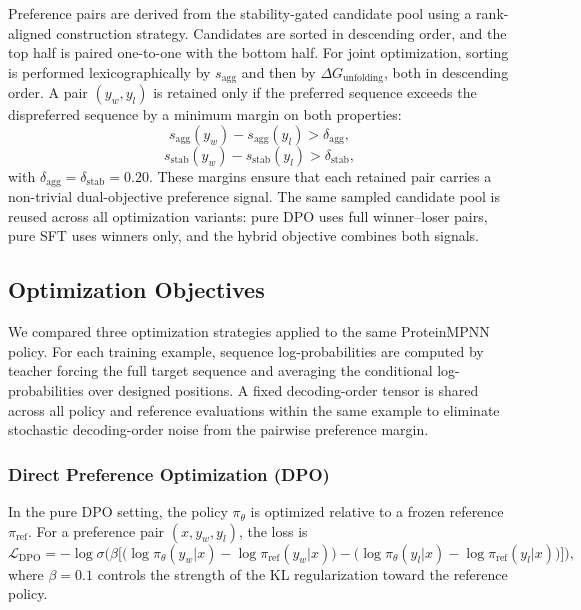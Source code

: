 \documentclass[pdflatex,sn-mathphys-num]{sn-jnl}%
\theoremstyle{thmstyleone}%
\theoremstyle{thmstyletwo}%
\theoremstyle{thmstylethree}%
\begin{document}
Preference pairs are derived from the stability-gated candidate pool using a rank-aligned construction strategy. Candidates are sorted in descending order, and the top half is paired one-to-one with the bottom half. For joint optimization, sorting is performed lexicographically by $s_{\mathrm{agg}}$ and then by $\Delta G_{\mathrm{unfolding}}$, both in descending order. A pair $(y_w,y_l)$ is retained only if the preferred sequence exceeds the dispreferred sequence by a minimum margin on both properties:
\begin{equation}
s_{\mathrm{agg}}(y_w) - s_{\mathrm{agg}}(y_l) > \delta_{\mathrm{agg}},
\end{equation}
\begin{equation}
s_{\mathrm{stab}}(y_w) - s_{\mathrm{stab}}(y_l) > \delta_{\mathrm{stab}},
\end{equation}
with $\delta_{\mathrm{agg}}=\delta_{\mathrm{stab}}=0.20$. These margins ensure that each retained pair carries a non-trivial dual-objective preference signal. The same sampled candidate pool is reused across all optimization variants: pure DPO uses full winner--loser pairs, pure SFT uses winners only, and the hybrid objective combines both signals.

\subsection{Optimization Objectives}\label{sec:objectives}

We compared three optimization strategies applied to the same ProteinMPNN policy. For each training example, sequence log-probabilities are computed by teacher forcing the full target sequence and averaging the conditional log-probabilities over designed positions. A fixed decoding-order tensor is shared across all policy and reference evaluations within the same example to eliminate stochastic decoding-order noise from the pairwise preference margin.

\subsubsection{Direct Preference Optimization (DPO)}

In the pure DPO setting, the policy $\pi_\theta$ is optimized relative to a frozen reference $\pi_{\mathrm{ref}}$. For a preference pair $(x, y_w, y_l)$, the loss is
\begin{equation}
\mathcal{L}_{\mathrm{DPO}} =
-\log \sigma \!\Big(
\beta \big[
\big(\log \pi_\theta(y_w|x) - \log \pi_{\mathrm{ref}}(y_w|x)\big)
- \big(\log \pi_\theta(y_l|x) - \log \pi_{\mathrm{ref}}(y_l|x)\big)
\big]
\Big),
\end{equation}
where $\beta = 0.1$ controls the strength of the KL regularization toward the reference policy.
\end{document}

